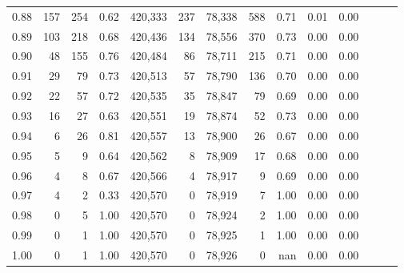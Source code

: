 \begin{tabular}{rrrrrrrrrrrrrr}
0.88 &     157 &    254 &  0.62 &  420,333 &      237 &  78,338 &     588 &  0.71 &  0.01 &      0.00 \\
0.89 &     103 &    218 &  0.68 &  420,436 &      134 &  78,556 &     370 &  0.73 &  0.00 &      0.00 \\
0.90 &      48 &    155 &  0.76 &  420,484 &       86 &  78,711 &     215 &  0.71 &  0.00 &      0.00 \\
0.91 &      29 &     79 &  0.73 &  420,513 &       57 &  78,790 &     136 &  0.70 &  0.00 &      0.00 \\
0.92 &      22 &     57 &  0.72 &  420,535 &       35 &  78,847 &      79 &  0.69 &  0.00 &      0.00 \\
0.93 &      16 &     27 &  0.63 &  420,551 &       19 &  78,874 &      52 &  0.73 &  0.00 &      0.00 \\
0.94 &       6 &     26 &  0.81 &  420,557 &       13 &  78,900 &      26 &  0.67 &  0.00 &      0.00 \\
0.95 &       5 &      9 &  0.64 &  420,562 &        8 &  78,909 &      17 &  0.68 &  0.00 &      0.00 \\
0.96 &       4 &      8 &  0.67 &  420,566 &        4 &  78,917 &       9 &  0.69 &  0.00 &      0.00 \\
0.97 &       4 &      2 &  0.33 &  420,570 &        0 &  78,919 &       7 &  1.00 &  0.00 &      0.00 \\
0.98 &       0 &      5 &  1.00 &  420,570 &        0 &  78,924 &       2 &  1.00 &  0.00 &      0.00 \\
0.99 &       0 &      1 &  1.00 &  420,570 &        0 &  78,925 &       1 &  1.00 &  0.00 &      0.00 \\
1.00 &       0 &      1 &  1.00 &  420,570 &        0 &  78,926 &       0 &   nan &  0.00 &      0.00 \\
\bottomrule
\end{tabular}
